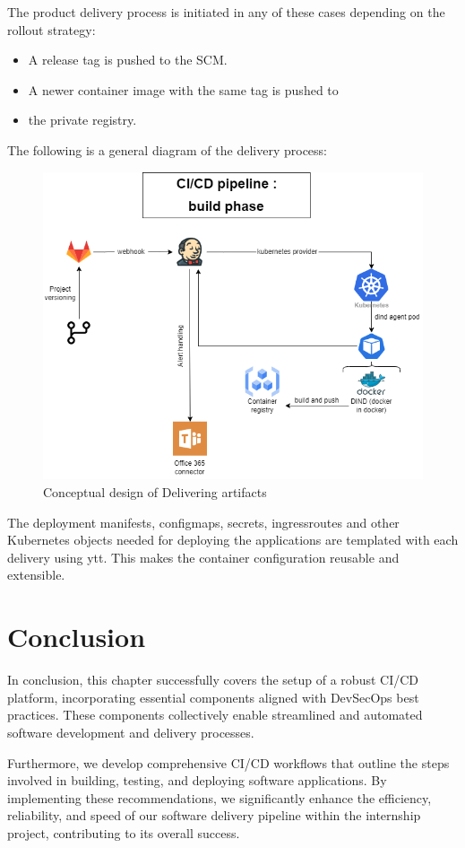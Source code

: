 The product delivery process is initiated in any of these cases depending on the rollout strategy: 

\begin{itemize}[label={--}]
\item A release tag is pushed to the SCM. 
\item A newer container image with the same tag is pushed to \item the private registry. 
\end{itemize}

The following is a general diagram of the delivery process: 

\begin{figure}[H]\centering
\includegraphics[width=1.0\textwidth,angle=00]{assets/f49.png}
\caption{Conceptual design of Delivering artifacts }
\label{fig:Conceptual design of Delivering artifacts }
\end{figure}

The deployment manifests, configmaps, secrets, ingressroutes and other Kubernetes objects needed for deploying the applications are templated with each delivery using ytt. This makes the container configuration reusable and extensible.

\section*{Conclusion}

In conclusion, this chapter successfully covers the setup of a robust CI/CD platform, incorporating essential components aligned with DevSecOps best practices. These components collectively enable streamlined and automated software development and delivery processes.

Furthermore, we develop comprehensive CI/CD workflows that outline the steps involved in building, testing, and deploying software applications. By implementing these recommendations, we significantly enhance the efficiency, reliability, and speed of our software delivery pipeline within the internship project, contributing to its overall success.
